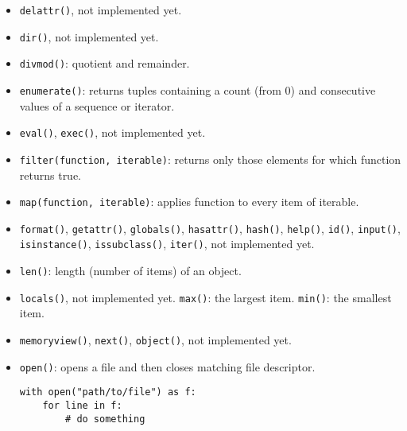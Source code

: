 \begin{itemize}
\item
\texttt{delattr()},
\dotfill not implemented yet.

\item
\texttt{dir()},
\dotfill not implemented yet.

\item \texttt{divmod()}: quotient and remainder.

\item \texttt{enumerate()}: returns tuples containing a count (from 0) and consecutive values of a sequence or iterator.

\item
\texttt{eval()},
\texttt{exec()},
\dotfill not implemented yet.

\item \texttt{filter(function, iterable)}: returns only those elements for which function returns true.

\item \texttt{map(function, iterable)}: applies function to every item of iterable.

\item
\texttt{format()},
\texttt{getattr()},
\texttt{globals()},
\texttt{hasattr()},
\texttt{hash()},
\texttt{help()},
\texttt{id()},
\texttt{input()},
\texttt{isinstance()},
\texttt{issubclass()},
\texttt{iter()},
\dotfill not implemented yet.

\item \texttt{len()}: length (number of items) of an object.

\item
\texttt{locals()},
\dotfill not implemented yet.
\texttt{max()}: the largest item.
\texttt{min()}: the smallest item.

\item
\texttt{memoryview()},
\texttt{next()},
\texttt{object()},
\dotfill not implemented yet.

\item \texttt{open()}: opens a file and then closes matching file descriptor.
\begin{verbatim}
with open("path/to/file") as f:
	for line in f:
		# do something


\end{verbatim}
\end{itemize}
